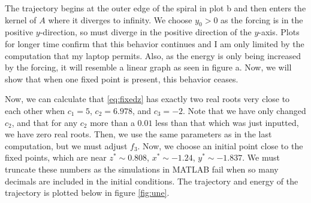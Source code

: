 \documentclass[11pt]{article}
\begin{document}
The trajectory begins at the outer edge of the spiral in plot b and then enters the kernel of $A$ where it diverges to infinity. We choose $y_0 > 0$ as the forcing is in the positive $y$-direction, so must diverge in the positive direction of the $y$-axis. Plots for longer time confirm that this behavior continues and I am only limited by the computation that my laptop permits. Also, as the energy is only being increased by the forcing, it will resemble a linear graph as seen in figure a. Now, we will show that when one fixed point is present, this behavior ceases. 

Now, we can calculate that \eqref{eq:fixedz} has exactly two real roots very close to each other when $c_1 = 5$, $c_2 = 6.978$, and $c_3 = -2$. Note that we have only changed $c_2$, and that for any $c_2$ more than a $0.01$ less than that which was just inputted, we have zero real roots. Then, we use the same parameters as in the last computation, but we must adjust $f_3$. Now, we choose an initial point close to the fixed points, which are near $z^* \sim 0.808$, $x^* \sim −1.24$, $y^* \sim −1.837$. We must truncate these numbers as the simulations in MATLAB fail when so many decimals are included in the initial conditions. The trajectory and energy of the trajectory is plotted below in figure \ref{fig:une}. 
\end{document}

